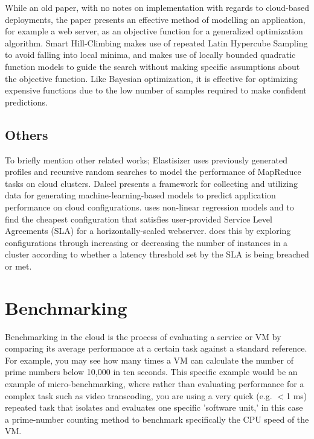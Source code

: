 \documentclass{report}
\begin{document}
While an old paper, with no notes on implementation with regards to cloud-based deployments, the paper presents an effective method of modelling an application, for example a web server, as an objective function for a generalized optimization algorithm. Smart Hill-Climbing makes use of repeated Latin Hypercube Sampling to avoid falling into local minima, and makes use of locally bounded quadratic function models to guide the search without making specific assumptions about the objective function. Like Bayesian optimization, it is effective for optimizing expensive functions due to the low number of samples required to make confident predictions. 

\subsection{Others}
To briefly mention other related works; Elastisizer\cite{Herodotou2011} uses previously generated profiles and recursive random searches to model the performance of MapReduce tasks on cloud clusters. Daleel\cite{Samreen} presents a framework for collecting and utilizing data for generating machine-learning-based models to predict application performance on cloud configurations. \cite{Bodik2009} uses non-linear regression models and to find the cheapest configuration that satisfies user-provided Service Level Agreements (SLA) for a horizontally-scaled webserver. \cite{Bodik2009} does this by exploring configurations through increasing or decreasing the number of instances in a cluster according to whether a latency threshold set by the SLA is being breached or met. 

\section{Benchmarking}
Benchmarking in the cloud is the process of evaluating a service or VM by comparing its average performance at a certain task against a standard reference\cite{Binnig2009}. For example, you may see how many times a VM can calculate the number of prime numbers below 10,000 in ten seconds. This specific example would be an example of micro-benchmarking, where rather than evaluating performance for a complex task such as video transcoding, you are using a very quick (e.g. $<$1 ms) repeated task that isolates and evaluates one specific 'software unit,'\cite{Laaber2019} in this case a prime-number counting method to benchmark specifically the CPU speed of the VM.
\end{document}
